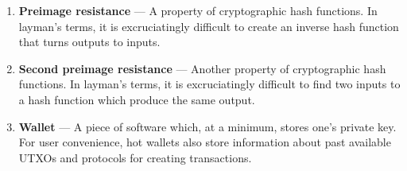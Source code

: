 \documentclass[full.tex]{subfiles}
\begin{document}
\begin{enumerate}
        \item \textbf{Preimage resistance} --- A property of cryptographic hash functions. In layman's terms, it is excruciatingly difficult to create an inverse hash function that turns outputs to inputs.
        \item \textbf{Second preimage resistance} --- Another property of cryptographic hash functions. In layman's terms, it is excruciatingly difficult to find two inputs to a hash function which produce the same output.
        \item \textbf{Wallet} --- A piece of software which, at a minimum, stores one's private key. For user convenience, hot wallets also store information about past available UTXOs and protocols for creating transactions.
    \end{enumerate}
\end{document}
